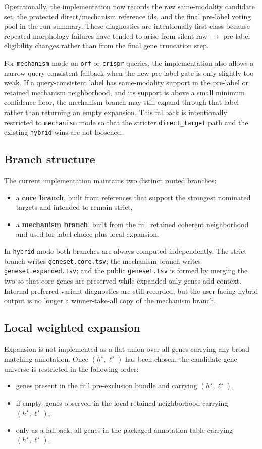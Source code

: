 \documentclass[11pt]{article}
\begin{document}
Operationally, the implementation now records the raw same-modality candidate set, the protected direct/mechanism reference ids, and the final pre-label voting pool in the run summary. These diagnostics are intentionally first-class because repeated morphology failures have tended to arise from silent raw $\rightarrow$ pre-label eligibility changes rather than from the final gene truncation step.

For \texttt{mechanism} mode on \texttt{orf} or \texttt{crispr} queries, the implementation also allows a narrow query-consistent fallback when the new pre-label gate is only slightly too weak. If a query-consistent label has same-modality support in the pre-label or retained mechanism neighborhood, and its support is above a small minimum confidence floor, the mechanism branch may still expand through that label rather than returning an empty expansion. This fallback is intentionally restricted to \texttt{mechanism} mode so that the stricter \texttt{direct\_target} path and the existing \texttt{hybrid} wins are not loosened.

\subsection{Branch structure}
The current implementation maintains two distinct routed branches:
\begin{itemize}[leftmargin=2em]
\item a \textbf{core branch}, built from references that support the strongest nominated targets and intended to remain strict,
\item a \textbf{mechanism branch}, built from the full retained coherent neighborhood and used for label choice plus local expansion.
\end{itemize}

In \texttt{hybrid} mode both branches are always computed independently. The strict branch writes \texttt{geneset.core.tsv}; the mechanism branch writes \texttt{geneset.expanded.tsv}; and the public \texttt{geneset.tsv} is formed by merging the two so that core genes are preserved while expanded-only genes add context. Internal preferred-variant diagnostics are still recorded, but the user-facing hybrid output is no longer a winner-take-all copy of the mechanism branch.

\subsection{Local weighted expansion}
Expansion is not implemented as a flat union over all genes carrying any broad matching annotation. Once $(h^\star, \ell^\star)$ has been chosen, the candidate gene universe is restricted in the following order:
\begin{itemize}[leftmargin=2em]
\item genes present in the full pre-exclusion bundle and carrying $(h^\star, \ell^\star)$,
\item if empty, genes observed in the local retained neighborhood carrying $(h^\star, \ell^\star)$,
\item only as a fallback, all genes in the packaged annotation table carrying $(h^\star, \ell^\star)$.
\end{itemize}
\end{document}
